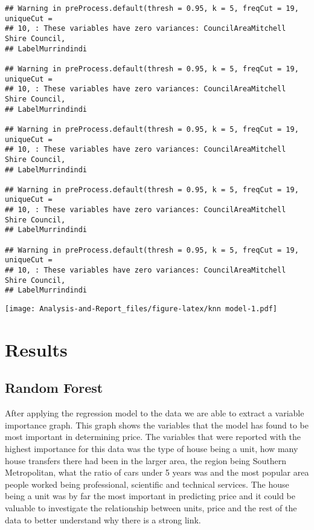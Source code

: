 \documentclass[
]{article}
\begin{document}
\begin{verbatim}
## Warning in preProcess.default(thresh = 0.95, k = 5, freqCut = 19, uniqueCut =
## 10, : These variables have zero variances: CouncilAreaMitchell Shire Council,
## LabelMurrindindi

## Warning in preProcess.default(thresh = 0.95, k = 5, freqCut = 19, uniqueCut =
## 10, : These variables have zero variances: CouncilAreaMitchell Shire Council,
## LabelMurrindindi

## Warning in preProcess.default(thresh = 0.95, k = 5, freqCut = 19, uniqueCut =
## 10, : These variables have zero variances: CouncilAreaMitchell Shire Council,
## LabelMurrindindi

## Warning in preProcess.default(thresh = 0.95, k = 5, freqCut = 19, uniqueCut =
## 10, : These variables have zero variances: CouncilAreaMitchell Shire Council,
## LabelMurrindindi

## Warning in preProcess.default(thresh = 0.95, k = 5, freqCut = 19, uniqueCut =
## 10, : These variables have zero variances: CouncilAreaMitchell Shire Council,
## LabelMurrindindi
\end{verbatim}

\texttt{[image: Analysis-and-Report\_files/figure-latex/knn model-1.pdf]}

\hypertarget{results}{%
\section{Results}\label{results}}

\hypertarget{random-forest}{%
\subsection{Random Forest}\label{random-forest}}

After applying the regression model to the data we are able to extract a
variable importance graph. This graph shows the variables that the model
has found to be most important in determining price. The variables that
were reported with the highest importance for this data was the type of
house being a unit, how many house transfers there had been in the
larger area, the region being Southern Metropolitan, what the ratio of
cars under 5 years was and the most popular area people worked being
professional, scientific and technical services. The house being a unit
was by far the most important in predicting price and it could be
valuable to investigate the relationship between units, price and the
rest of the data to better understand why there is a strong link.
\end{document}
